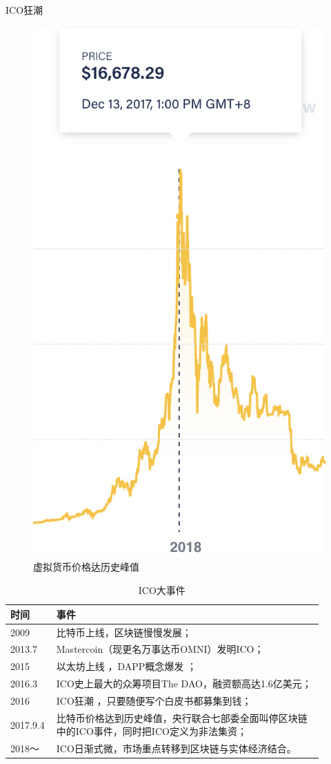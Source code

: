 \documentclass[11pt]{beamer}
\begin{document}
\begin{frame}{ICO狂潮}
\begin{minipage}[t]{0.4\linewidth}
	\begin{figure}
		\centering
		\includegraphics[width=0.7\linewidth,height=0.7\textheight]{figures/94btcprice}
		\caption{虚拟货币价格达历史峰值}
	\end{figure}
\end{minipage}%
\begin{minipage}[t]{0.6\linewidth}
	\begin{table}[]
		\footnotesize
		\begin{tabular}{@{}p{0.1\linewidth}p{0.8\linewidth}@{}}
			\toprule
			时间     & 事件                              \\ \midrule
			2009 & 比特币上线，区块链慢慢发展；\\
			2013.7 & Mastercoin（现更名万事达币OMNI）发明ICO； \\
			2015   &     以太坊上线 ，DAPP概念爆发 ；                   \\
			2016.3 & ICO史上最大的众筹项目The DAO，融资额高达1.6亿美元； \\ 
			2016 & ICO狂潮 ，只要随便写个白皮书都募集到钱；\\
			2017.9.4  &  比特币价格达到历史峰值，央行联合七部委全面叫停区块链中的ICO事件，同时把ICO定义为非法集资；                        \\ 
			2018～ & ICO日渐式微，市场重点转移到区块链与实体经济结合。 \\
			\bottomrule
		\end{tabular}
		\caption{ICO大事件}
	\end{table}
\end{minipage}%
\end{frame}
\end{document}
